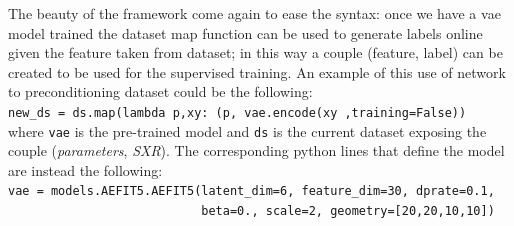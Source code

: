 The beauty of the \TF framework come again to ease the syntax: once we have a vae model trained the dataset map function can be used to generate labels online given the feature taken from dataset; in this way a couple (feature, label) can be created to be used for the supervised training.
An example of this use of network to preconditioning dataset could be the following: \\
\verb|new_ds = ds.map(lambda p,xy: (p, vae.encode(xy ,training=False))| \\
where \verb|vae| is the pre-trained model and \verb|ds| is the current dataset exposing the couple (\textit{parameters}, \textit{SXR}).
The corresponding python lines that define the model are instead the following: \\
\verb|vae = models.AEFIT5.AEFIT5(latent_dim=6, feature_dim=30, dprate=0.1,|\\
\verb|                           beta=0., scale=2, geometry=[20,20,10,10])|\\

